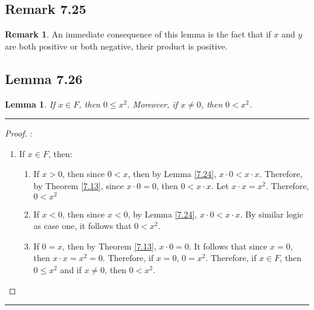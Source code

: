 \documentclass[openany, amssymb, psamsfonts]{amsart}
\newtheorem{lem}{Lemma}[section]
\theoremstyle{definition}
\newtheorem{rem}{Remark}[section]
\numberwithin{equation}{section}
\begin{document}
\subsection*{Remark 7.25}
\label{7.25}
\begin{rem}
An immediate consequence of this lemma is the fact that if $x$ and $y$ are both positive or both negative, their product is positive.
\end{rem}

\subsection*{Lemma 7.26}
\begin{lem}
\label{7.26}
	If $x \in F$, then $0 \leq x^2$.  Moreover, if $x \neq 0$, then $0 < x^2$.
\end{lem}
\vspace{4pt}     \hrule   \vspace{4pt}
\begin{proof}:
\begin{enumerate}
    \item If $x\in F$, then:
    \begin{enumerate}
    \item If $x>0$, then since $0<x$, then by Lemma \ref{7.24}, $x\cdot 0 < x\cdot x$. Therefore, by Theorem \ref{7.13}, since $x\cdot 0 = 0$, then $0< x\cdot x$. Let $x\cdot x = x^2$. Therefore, $0<x^2$ 
    \item If $x<0$, then since $x<0$, by Lemma \ref{7.24}, $x\cdot 0 < x\cdot x$. By similar logic as case one, it follows that $0< x^2$.
    \item If $0=x$, then by Theorem \ref{7.13}, $x\cdot 0 = 0$. It follows that since $x=0$, then $x\cdot x = x^2 =0$. Therefore, if $x=0$, $0=x^2$.
    Therefore, if $x\in F$, then $0\leq x^2$ and if $x\neq 0$, then $0<x^2$.
    \end{enumerate}
\end{enumerate}
 \end{proof}
\vspace{4pt}     \hrule   \vspace{4pt}
\end{document}
